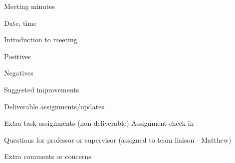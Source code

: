 Meeting minutes

Date, time

Introduction to meeting 

Positives 

Negatives

Suggested improvements

Deliverable assignments/updates

Extra task assignments (non deliverable)
Assignment check-in 

Questions for professor or supervisor (assigned to team liaison - Matthew)

Extra comments or concerns
